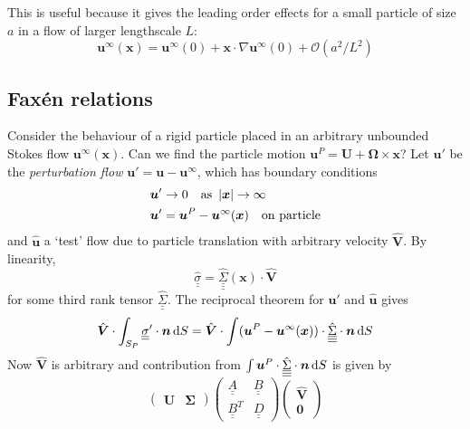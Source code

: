 \documentclass{jknotes}
\newcommand{\dunder}[1]{\underline{\underline{#1}}}
\newcommand{\x}{\bm{x}}
\renewcommand{\u}{\bm{u}}
\begin{document}
This is useful because it gives the leading order effects for a small particle
of size $a$ in a flow of larger lengthscale $L$:
\begin{equation}
	\bm{u}^\infty(\x) = \bm{u}^\infty(0) + \x \cdot \nabla \bm{u}^\infty(0) +
	\mathcal{O}(a^2/L^2)
\end{equation}

\subsection{Fax\'{e}n relations}
Consider the behaviour of a rigid particle placed in an arbitrary unbounded
Stokes flow $\bm{u}^\infty(\x)$. Can we find the particle motion $\u^P =
\bm{U} + \bm{\Omega} \times \x$? Let $\u'$ be the \emph{perturbation flow}
$\u' = \u - \u^\infty$, which has boundary conditions
\begin{align}
	\u' &\to 0 \hspace{1em} \text{as} \,\,\, \abs{\x} \to \infty \\
	\u' &= \u^P - \u^\infty(\x) \hspace{1em} \text{on particle}
\end{align}
and $\hat{\u}$ a `test' flow due to particle translation with arbitrary
velocity $\hat{\bm{V}}$. By linearity, 
\begin{equation}
	\hat{\dunder{\sigma}} = \hat{\dunder{\underline{\Sigma}}}(\x) \cdot
	\hat{\bm{V}}
\end{equation}
for some third rank tensor $\hat{\dunder{\Sigma}}$. The reciprocal theorem for
$\u'$ and $\hat{\u}$ gives
\begin{equation}
	\hat{\bm{V}} \cdot \int_{S_P} \dunder{\sigma}' \cdot \bm{n}\,\diffd S =
	\hat{\bm{V}} \cdot \int (\u^P - \u^\infty(\x))\cdot
	\hat{\dunder{\underline{\Sigma}}} \cdot \bm{n}\,\diffd S
\end{equation}
Now $\hat{\bm{V}}$ is arbitrary and contribution from $\int \u^P \cdot
\hat{\dunder{\underline{\Sigma}}}\cdot\bm{n}\,\diffd S$ is given by
\begin{equation}
\begin{pmatrix} \bm{U} & \bm{\Sigma}\end{pmatrix} \begin{pmatrix} \dunder{A} &
\dunder{B} \\ \dunder{B}^T & \dunder{D} \end{pmatrix} \begin{pmatrix}
\hat{\bm{V}} \\ \bm{0} \end{pmatrix}
\end{equation}
\end{document}
